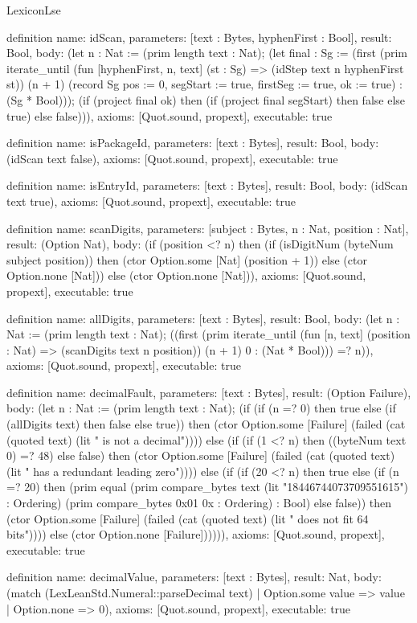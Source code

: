 \begin{lexlean}{LexiconLse}
\begin{semanticmodule}
definition{
  name: idScan,
  parameters: [text : Bytes, hyphenFirst : Bool],
  result: Bool,
  body: (let n : Nat := (prim length text : Nat); (let final : Sg := (first (prim iterate_until (fun [hyphenFirst, n, text] (st : Sg) => (idStep text n hyphenFirst st)) (n + 1) (record Sg {pos := 0, segStart := true, firstSeg := true, ok := true}) : (Sg * Bool))); (if (project final ok) then (if (project final segStart) then false else true) else false))),
  axioms: [Quot.sound, propext],
  executable: true
}

definition{
  name: isPackageId,
  parameters: [text : Bytes],
  result: Bool,
  body: (idScan text false),
  axioms: [Quot.sound, propext],
  executable: true
}

definition{
  name: isEntryId,
  parameters: [text : Bytes],
  result: Bool,
  body: (idScan text true),
  axioms: [Quot.sound, propext],
  executable: true
}

definition{
  name: scanDigits,
  parameters: [subject : Bytes, n : Nat, position : Nat],
  result: (Option Nat),
  body: (if (position <? n) then (if (isDigitNum (byteNum subject position)) then (ctor Option.some [Nat] (position + 1)) else (ctor Option.none [Nat])) else (ctor Option.none [Nat])),
  axioms: [Quot.sound, propext],
  executable: true
}

definition{
  name: allDigits,
  parameters: [text : Bytes],
  result: Bool,
  body: (let n : Nat := (prim length text : Nat); ((first (prim iterate_until (fun [n, text] (position : Nat) => (scanDigits text n position)) (n + 1) 0 : (Nat * Bool))) =? n)),
  axioms: [Quot.sound, propext],
  executable: true
}

definition{
  name: decimalFault,
  parameters: [text : Bytes],
  result: (Option Failure),
  body: (let n : Nat := (prim length text : Nat); (if (if (n =? 0) then true else (if (allDigits text) then false else true)) then (ctor Option.some [Failure] (failed (cat (quoted text) (lit " is not a decimal")))) else (if (if (1 <? n) then ((byteNum text 0) =? 48) else false) then (ctor Option.some [Failure] (failed (cat (quoted text) (lit " has a redundant leading zero")))) else (if (if (20 <? n) then true else (if (n =? 20) then (prim equal (prim compare_bytes text (lit "18446744073709551615") : Ordering) (prim compare_bytes 0x01 0x : Ordering) : Bool) else false)) then (ctor Option.some [Failure] (failed (cat (quoted text) (lit " does not fit 64 bits")))) else (ctor Option.none [Failure]))))),
  axioms: [Quot.sound, propext],
  executable: true
}

definition{
  name: decimalValue,
  parameters: [text : Bytes],
  result: Nat,
  body: (match (LexLeanStd.Numeral::parseDecimal text)
    | Option.some value => value
    | Option.none => 0),
  axioms: [Quot.sound, propext],
  executable: true
}


\end{semanticmodule}
\end{lexlean}
